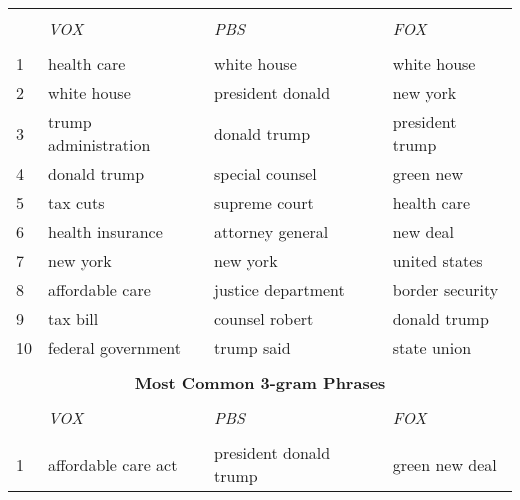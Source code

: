 \begin{table}[]
\begin{tabular}{l||l|l|l}
        &                             &                            &                             \\
        & \textit{VOX}                & \textit{PBS}               & \textit{FOX}                \\ \hline 
        &                             &                            &                             \\
    1   & health care                 & white house                & white house                 \\
    2   & white house                 & president donald           & new york                    \\
    3   & trump administration        & donald trump               & president trump             \\
    4   & donald trump                & special counsel            & green new                   \\
    5   & tax cuts                    & supreme court              & health care                 \\
    6   & health insurance            & attorney general           & new deal                    \\
    7   & new york                    & new york                   & united states               \\
    8   & affordable care             & justice department         & border security             \\
    9   & tax bill                    & counsel robert             & donald trump                \\
    10  & federal government          & trump said                 & state union                 \\ \hline \hline %
    \multicolumn{4}{c}{}                                                                       \\ 
    \multicolumn{4}{c}{\textbf{Most Common 3-gram Phrases}}                                    \\ \hline
        &                             &                            &                             \\
        & \textit{VOX}                & \textit{PBS}               & \textit{FOX}                \\ \hline 
        &                             &                            &                             \\
    1   & affordable care act         & president donald trump     & green new deal              \\ 

\end{tabular}
\end{table}
